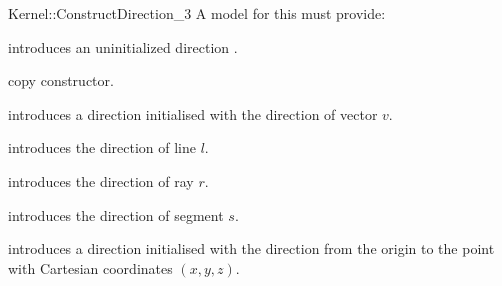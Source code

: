 \begin{ccRefFunctionObjectConcept}{Kernel::ConstructDirection_3}
A model for this must provide:



\ccHidden {}
             {introduces an uninitialized direction .}

\ccHidden {}
            {copy constructor.}

            {introduces a direction  initialised with the 
             direction of vector $v$.}

            {introduces the direction of line $l$.}

            {introduces the direction of ray $r$.}

            {introduces the direction of segment $s$.}

\ccHidden{}
            {introduces a direction  initialised with the direction 
             from the origin to the point with Cartesian coordinates $(x, y, z)$.}

\ccSeeAlso

  \\

\end{ccRefFunctionObjectConcept}
